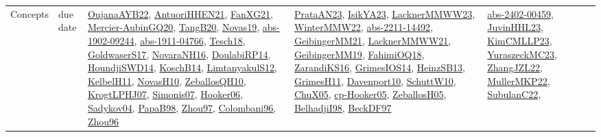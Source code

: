 {\begin{longtable}{llp{6cm}p{6cm}p{6cm}}
Concepts & due date & \href{papers/OujanaAYB22.pdf}{OujanaAYB22}\cite{OujanaAYB22}, \href{papers/AntuoriHHEN21.pdf}{AntuoriHHEN21}\cite{AntuoriHHEN21}, \href{articles/FanXG21.pdf}{FanXG21}\cite{FanXG21}, \href{papers/Mercier-AubinGQ20.pdf}{Mercier-AubinGQ20}\cite{Mercier-AubinGQ20}, \href{papers/TangB20.pdf}{TangB20}\cite{TangB20}, \href{articles/Novas19.pdf}{Novas19}\cite{Novas19}, \href{articles/abs-1902-09244.pdf}{abs-1902-09244}\cite{abs-1902-09244}, \href{articles/abs-1911-04766.pdf}{abs-1911-04766}\cite{abs-1911-04766}, \href{papers/Tesch18.pdf}{Tesch18}\cite{Tesch18}, \href{papers/GoldwaserS17.pdf}{GoldwaserS17}\cite{GoldwaserS17}, \href{articles/NovaraNH16.pdf}{NovaraNH16}\cite{NovaraNH16}, \href{papers/DoulabiRP14.pdf}{DoulabiRP14}\cite{DoulabiRP14}, \href{papers/HoundjiSWD14.pdf}{HoundjiSWD14}\cite{HoundjiSWD14}, \href{papers/KoschB14.pdf}{KoschB14}\cite{KoschB14}, \href{articles/LimtanyakulS12.pdf}{LimtanyakulS12}\cite{LimtanyakulS12}, \href{articles/KelbelH11.pdf}{KelbelH11}\cite{KelbelH11}, \href{articles/NovasH10.pdf}{NovasH10}\cite{NovasH10}, \href{articles/ZeballosQH10.pdf}{ZeballosQH10}\cite{ZeballosQH10}, \href{papers/KrogtLPHJ07.pdf}{KrogtLPHJ07}\cite{KrogtLPHJ07}, \href{articles/Simonis07.pdf}{Simonis07}\cite{Simonis07}, \href{articles/Hooker06.pdf}{Hooker06}\cite{Hooker06}, \href{papers/Sadykov04.pdf}{Sadykov04}\cite{Sadykov04}, \href{articles/PapaB98.pdf}{PapaB98}\cite{PapaB98}, \href{articles/Zhou97.pdf}{Zhou97}\cite{Zhou97}, \href{papers/Colombani96.pdf}{Colombani96}\cite{Colombani96}, \href{papers/Zhou96.pdf}{Zhou96}\cite{Zhou96} & \href{articles/PrataAN23.pdf}{PrataAN23}\cite{PrataAN23}, \href{articles/IsikYA23.pdf}{IsikYA23}\cite{IsikYA23}, \href{articles/LacknerMMWW23.pdf}{LacknerMMWW23}\cite{LacknerMMWW23}, \href{papers/WinterMMW22.pdf}{WinterMMW22}\cite{WinterMMW22}, \href{articles/abs-2211-14492.pdf}{abs-2211-14492}\cite{abs-2211-14492}, \href{papers/GeibingerMM21.pdf}{GeibingerMM21}\cite{GeibingerMM21}, \href{papers/LacknerMMWW21.pdf}{LacknerMMWW21}\cite{LacknerMMWW21}, \href{papers/GeibingerMM19.pdf}{GeibingerMM19}\cite{GeibingerMM19}, \href{articles/FahimiOQ18.pdf}{FahimiOQ18}\cite{FahimiOQ18}, \href{articles/ZarandiKS16.pdf}{ZarandiKS16}\cite{ZarandiKS16}, \href{articles/GrimesIOS14.pdf}{GrimesIOS14}\cite{GrimesIOS14}, \href{articles/HeinzSB13.pdf}{HeinzSB13}\cite{HeinzSB13}, \href{papers/GrimesH11.pdf}{GrimesH11}\cite{GrimesH11}, \href{papers/Davenport10.pdf}{Davenport10}\cite{Davenport10}, \href{papers/SchuttW10.pdf}{SchuttW10}\cite{SchuttW10}, \href{papers/ChuX05.pdf}{ChuX05}\cite{ChuX05}, \href{papers/cp-Hooker05.pdf}{cp-Hooker05}\cite{cp-Hooker05}, \href{articles/ZeballosH05.pdf}{ZeballosH05}\cite{ZeballosH05}, \href{articles/BelhadjiI98.pdf}{BelhadjiI98}\cite{BelhadjiI98}, \href{papers/BeckDF97.pdf}{BeckDF97}\cite{BeckDF97} & \href{articles/abs-2402-00459.pdf}{abs-2402-00459}\cite{abs-2402-00459}, \href{papers/JuvinHHL23.pdf}{JuvinHHL23}\cite{JuvinHHL23}, \href{papers/KimCMLLP23.pdf}{KimCMLLP23}\cite{KimCMLLP23}, \href{papers/YuraszeckMC23.pdf}{YuraszeckMC23}\cite{YuraszeckMC23}, \href{papers/ZhangJZL22.pdf}{ZhangJZL22}\cite{ZhangJZL22}, \href{articles/MullerMKP22.pdf}{MullerMKP22}\cite{MullerMKP22}, \href{articles/SubulanC22.pdf}{SubulanC22}\cite{SubulanC22}, 
\end{longtable}}
